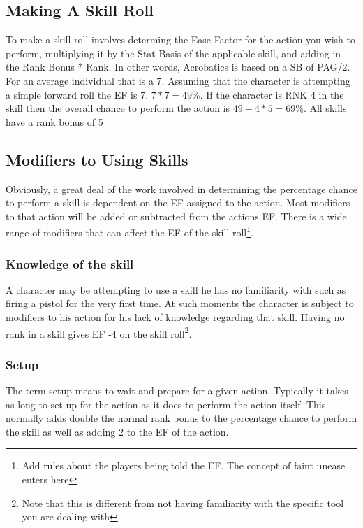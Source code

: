 \subsection{Making A Skill Roll}

To make a skill roll involves determing the Ease Factor for the action
you wish to perform, multiplying it by the Stat Basis of the applicable skill,
and adding in the Rank Bonus * Rank. In other words, Acrobatics is based on
a SB of PAG/2. For an average individual that is a 7. Assuming that the 
character is attempting a simple forward roll the EF is 7. \(7*7 =
49\%\). If the character is RNK 4 in the skill then 
the overall chance to perform the action is \(49 + 4 * 5 = 69\%\).
All skills have a rank bonus of 5%

\subsection{Modifiers to Using Skills}
Obviously, a great deal of the work involved in determining the
percentage chance to perform a skill is dependent on the EF assigned to the
action. Most modifiers to that action will be added or subtracted from
the actions EF. There is a wide range of modifiers that can affect the EF 
of the skill roll\footnote{Add rules about the players being told the 
EF. The concept of faint unease enters here}.

\subsubsection{Knowledge of the skill}
A character may be attempting to use a skill he has no familiarity 
with such as firing a pistol for the very first time. At such moments 
the character is subject to modifiers to his action for his lack of 
knowledge regarding that skill. Having no rank in a skill gives EF -4
on the skill roll\footnote{Note that this is different from not 
having familiarity with the specific tool you are dealing with}.

\subsubsection{Setup}
The term setup means to wait and prepare for a given action. Typically it
takes as long to set up for the action as it does to perform the action itself.
This normally adds double the normal rank bonus to the percentage chance
to perform the skill as well as adding 2 to the EF of the action.

